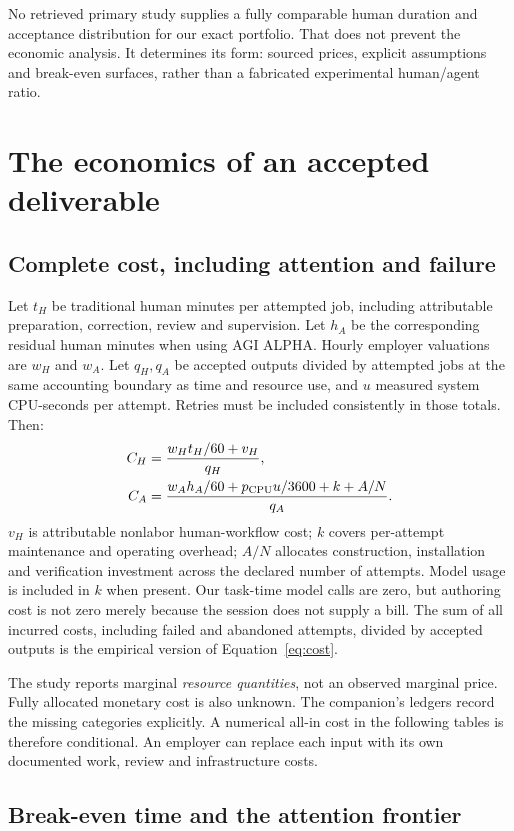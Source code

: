\documentclass[11pt,a4paper]{article}
\newcommand{\Alpha}{AGI ALPHA}
\begin{document}
No retrieved primary study supplies a fully comparable human duration and acceptance distribution for our exact portfolio. That does not prevent the economic analysis. It determines its form: sourced prices, explicit assumptions and break-even surfaces, rather than a fabricated experimental human/agent ratio.

\section{The economics of an accepted deliverable}

\subsection{Complete cost, including attention and failure}

Let $t_H$ be traditional human minutes per attempted job, including attributable preparation, correction, review and supervision. Let $h_A$ be the corresponding residual human minutes when using \Alpha. Hourly employer valuations are $w_H$ and $w_A$. Let $q_H,q_A$ be accepted outputs divided by attempted jobs at the same accounting boundary as time and resource use, and $u$ measured system CPU-seconds per attempt. Retries must be included consistently in those totals. Then:
\begin{align}
C_H &= \frac{w_Ht_H/60+v_H}{q_H},\\
C_A &= \frac{w_Ah_A/60+p_{\rm CPU}u/3600+k+A/N}{q_A}.
\label{eq:cost}
\end{align}
$v_H$ is attributable nonlabor human-workflow cost; $k$ covers per-attempt maintenance and operating overhead; $A/N$ allocates construction, installation and verification investment across the declared number of attempts. Model usage is included in $k$ when present. Our task-time model calls are zero, but authoring cost is not zero merely because the session does not supply a bill. The sum of all incurred costs, including failed and abandoned attempts, divided by accepted outputs is the empirical version of Equation~\ref{eq:cost}.

The study reports marginal \emph{resource quantities}, not an observed marginal price. Fully allocated monetary cost is also unknown. The companion's ledgers record the missing categories explicitly. A numerical all-in cost in the following tables is therefore conditional. An employer can replace each input with its own documented work, review and infrastructure costs.

\subsection{Break-even time and the attention frontier}
\end{document}
